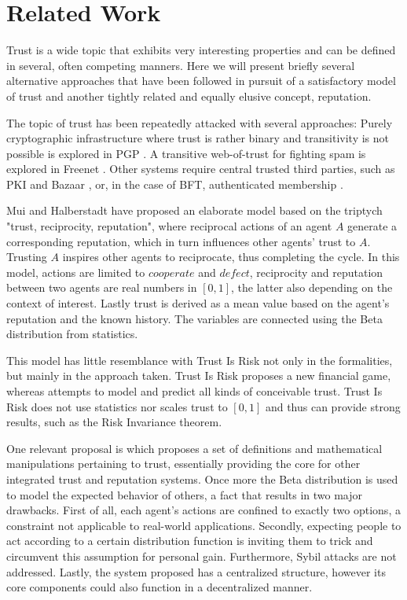 \section{Related Work}
  Trust is a wide topic that exhibits very interesting properties and can be defined in several, often competing manners.
  Here we will present briefly several alternative approaches that have been followed in pursuit of a satisfactory model of
  trust and another tightly related and equally elusive concept, reputation.

  The topic of trust has been repeatedly attacked with several approaches: Purely cryptographic infrastructure where trust is
  rather binary and transitivity is not possible is explored in PGP \cite{pgp}. A transitive web-of-trust for fighting spam
  is explored in Freenet \cite{freenet}. Other systems require central trusted third parties, such as PKI \cite{pki} and
  Bazaar \cite{bazaar}, or, in the case of BFT, authenticated membership \cite{byzantine}.

  Mui and Halberstadt \cite{mui} have proposed an elaborate model based on the triptych "trust, reciprocity, reputation",
  where reciprocal actions of an agent $A$ generate a corresponding reputation, which in turn influences other agents' trust
  to $A$. Trusting $A$ inspires other agents to reciprocate, thus completing the cycle. In this model, actions are limited to
  $cooperate$ and $defect$, reciprocity and reputation between two agents are real numbers in $\left[0, 1\right]$, the latter
  also depending on the context of interest. Lastly trust is derived as a mean value based on the agent's reputation and the
  known history. The variables are connected using the Beta distribution from statistics.

  This model has little resemblance with Trust Is Risk not only in the formalities, but mainly in the approach taken. Trust
  Is Risk proposes a new financial game, whereas \cite{mui} attempts to model and predict all kinds of conceivable trust.
  Trust Is Risk does not use statistics nor scales trust to $\left[0, 1\right]$ and thus can provide strong results, such as
  the Risk Invariance theorem.

  One relevant proposal is \cite{beta} which proposes a set of definitions and mathematical manipulations pertaining to
  trust, essentially providing the core for other integrated trust and reputation systems. Once more the Beta distribution is
  used to model the expected behavior of others, a fact that results in two major drawbacks. First of all, each agent's
  actions are confined to exactly two options, a constraint not applicable to real-world applications. Secondly, expecting
  people to act according to a certain distribution function is inviting them to trick and circumvent this assumption for
  personal gain. Furthermore, Sybil attacks are not addressed. Lastly, the system proposed has a centralized structure,
  however its core components could also function in a decentralized manner.

